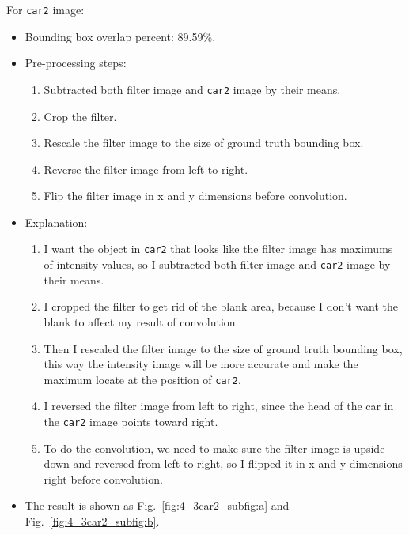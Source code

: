 \documentclass{assignment}
\begin{document}
\begin{problemlist}
For \texttt{car2} image:
\begin{itemize}
    \item Bounding box overlap percent: 89.59\%.
    \item Pre-processing steps: 
    \begin{enumerate}[label={\alph*)}]
        \item Subtracted both filter image and \texttt{car2} image by their means.
        \item Crop the filter.
        \item Rescale the filter image to the size of ground truth bounding box.
        \item Reverse the filter image from left to right.
        \item Flip the filter image in x and y dimensions before convolution.
    \end{enumerate}
    \item Explanation: 
    \begin{enumerate}[label={\alph*)}]
        \item I want the object in \texttt{car2} that looks like the filter image has maximums of intensity values, so I subtracted both filter image and \texttt{car2} image by their means.
        \item I cropped the filter to get rid of the blank area, because I don't want the blank to affect my result of convolution.
        \item Then I rescaled the filter image to the size of ground truth bounding box, this way the intensity image will be more accurate and make the maximum locate at the position of \texttt{car2}.
        \item I reversed the filter image from left to right, since the head of the car in the \texttt{car2} image points toward right.
        \item To do the convolution, we need to make sure the filter image is upside down and reversed from left to right, so I flipped it in x and y dimensions right before convolution.
    \end{enumerate}
    \item The result is shown as Fig.~\ref{fig:4_3car2_subfig:a} and Fig.~\ref{fig:4_3car2_subfig:b}.
\end{itemize}


\end{problemlist}
\end{document}

